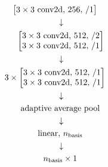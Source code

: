 \begin{gather*}
\begin{bmatrix}
            3 \times 3 \text{ conv2d, } 256, \, /1\\
        \end{bmatrix}\\
        \hphantom{3 \times} \downarrow\\
        \hphantom{3 \times}
        \begin{bmatrix}
            3 \times 3 \text{ conv2d, } 512, \, /2\\
            3 \times 3 \text{ conv2d, } 512, \, /1\\
        \end{bmatrix}\\
        \hphantom{3 \times} \downarrow\\
        3 \times 
        \begin{bmatrix}
            3 \times 3 \text{ conv2d, } 512, \, /1\\
            3 \times 3 \text{ conv2d, } 512, \, /1\\
        \end{bmatrix}\\
        \hphantom{3 \times} \downarrow\\
        \hphantom{3 \times}
        \text{adaptive average pool}\\
        \hphantom{3 \times} \downarrow\\
        \hphantom{3 \times}
        \text{linear, $n_{\text{basis}}$}\\
        \hphantom{3 \times} \downarrow\\
        \hphantom{3 \times} n_{\text{basis}} \times 1
    \end{gather*}
